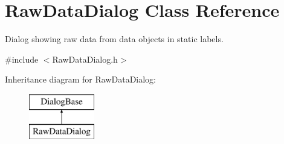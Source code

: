\hypertarget{class_raw_data_dialog}{
\section{RawDataDialog Class Reference}
\label{class_raw_data_dialog}
}


Dialog showing raw data from data objects in static labels.  




{\ttfamily \#include $<$RawDataDialog.h$>$}

Inheritance diagram for RawDataDialog:\begin{figure}[H]
\begin{center}
\leavevmode
\includegraphics[height=2.000000cm]{class_raw_data_dialog}
\end{center}
\end{figure}

